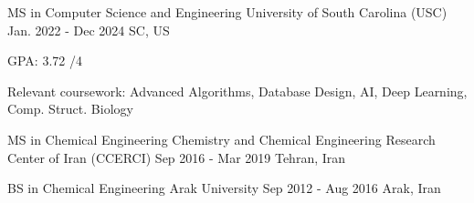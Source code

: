{}


\begin{cventries}

  \cventry
    {MS in Computer Science and Engineering}   %
    {University of South Carolina (USC)}        %
    {Jan. 2022 - Dec 2024}                      %
    {SC, US}                                   %
    {
      \begin{cvitems}                           %
        \item {GPA: 3.72 /4}
        \item {Relevant coursework: Advanced Algorithms, Database Design, AI, Deep Learning, Comp. Struct. Biology}
      \end{cvitems}
    }

\vspace{0.07cm}
\cventry
    {MS in Chemical Engineering}
    {Chemistry and Chemical Engineering Research Center of Iran (CCERCI)}
    {Sep 2016 - Mar 2019}
    {Tehran, Iran}
    {
    }

\vspace{-0.35cm}
\cventry
    {BS in Chemical Engineering}
    {Arak University}
    {Sep 2012 - Aug 2016}
    {Arak, Iran}
    {
    }

\end{cventries}
